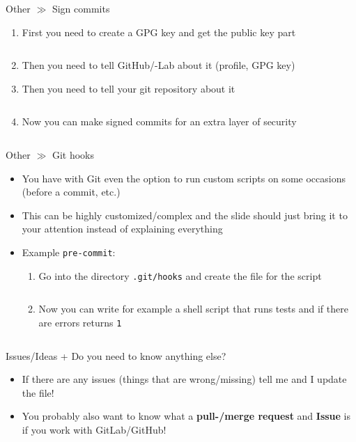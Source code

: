 \documentclass[10pt]{beamer}
\begin{document}
\begin{frame}{Other $\gg$ Sign commits}
	\begin{enumerate}
		\item First you need to create a GPG key and get the public key part
		\inputminted[bgcolor=lightGreyCustom,fontsize=\scriptsize]{sh}{./resources/git_sign_commits_01_gpg_key.sh}
		\item Then you need to tell GitHub/-Lab about it (profile, GPG key)
		\item Then you need to tell your git repository about it
		\inputminted[bgcolor=lightGreyCustom,fontsize=\scriptsize]{sh}{./resources/git_sign_commits_02_register_key.sh}
		\item Now you can make signed commits for an extra layer of security
		\inputminted[bgcolor=lightGreyCustom,fontsize=\scriptsize]{sh}{./resources/git_sign_commits_03_signed_commit.sh}
	\end{enumerate}
\end{frame}

\begin{frame}{Other $\gg$ Git hooks}
	\begin{itemize}
		\item You have with Git even the option to run custom scripts on some occasions (before a commit, etc.)
		\item This can be highly customized/complex and the slide should just bring it to your attention instead of explaining everything
		\item Example \texttt{pre-commit}:
		\begin{enumerate}
			\item Go into the directory \texttt{.git/hooks} and create the file for the script
			\inputminted[bgcolor=lightGreyCustom,fontsize=\scriptsize]{sh}{./resources/git_hooks_01_create.sh}
			\item Now you can write for example a shell script that runs tests and if there are errors returns \texttt{1}
			\inputminted[bgcolor=lightGreyCustom,fontsize=\scriptsize]{sh}{./resources/git_hooks_02_example.sh}
		\end{enumerate}
	\end{itemize}
\end{frame}

\begin{frame}{Issues/Ideas + Do you need to know anything else?}
	\begin{itemize}
		\item If there are any issues (things that are wrong/missing) tell me and I update the file!
		\item You probably also want to know what a \textbf{pull-/merge request} and \textbf{Issue} is if you work with GitLab/GitHub!
	\end{itemize}
\end{frame}
\end{document}
